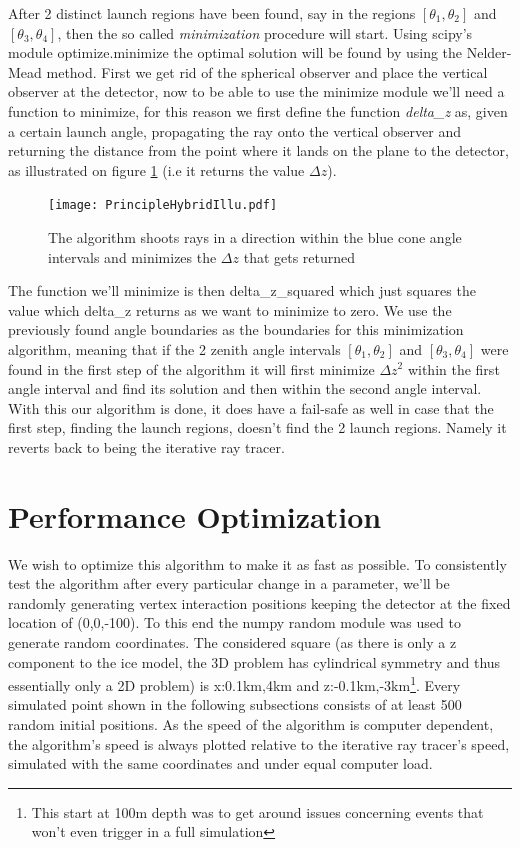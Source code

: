 After 2 distinct launch regions have been found, say in the regions
$[\theta_1,\theta_2]$ and $[\theta_3,\theta_4]$, 
then the so called \textit{minimization} procedure will
start. Using scipy's module optimize.minimize the optimal solution will be
found by using the Nelder-Mead method\cite{10.1093/comjnl/7.4.308}. First we
get rid of the spherical observer and place the vertical observer at the
detector, now to be able to use the minimize module we'll need a function to
minimize, for this reason we first define the function \textit{delta\_z} as,
given a certain launch angle, propagating the ray onto the vertical observer
and returning the distance from the point where it lands on the plane to the
detector, as illustrated on figure \ref{fig:PrincipleHybridIllu} (i.e it
returns the value $\Delta z$).
\begin{figure}
  \centering
  \texttt{[image: PrincipleHybridIllu.pdf]}
  \caption{The algorithm shoots rays in a direction within the blue cone angle intervals and minimizes the $\Delta z$ that gets returned}
  \label{fig:PrincipleHybridIllu}
\end{figure}
The function we'll minimize is then delta\_z\_squared which just squares the
value which delta\_z returns as we want to minimize to zero. 
We use the previously found angle boundaries as
the boundaries for this minimization algorithm, meaning that if the 2 zenith
angle intervals $[\theta_1,\theta_2]$ and $[\theta_3,\theta_4]$ were found in
the first step of the algorithm it will first minimize $\Delta z^2$ within the
first angle interval and find its solution and then within the second angle
interval. With this our algorithm is done, it does have a fail-safe as well in case
that the first step, finding the launch regions, doesn't find the 2 launch
regions.  Namely it reverts back to being the iterative ray tracer.

\section{Performance Optimization} 
We wish to optimize this algorithm to make
it as fast as possible.  To consistently test the algorithm after every
particular change in a parameter, we'll be randomly generating vertex
interaction positions keeping the detector at the fixed location of (0,0,-100).  To
this end the numpy random module was used to generate random coordinates. The
considered square (as there is only a z component to the ice model, the 3D
problem has cylindrical symmetry and thus essentially only a 2D problem) is
x:0.1km,4km and z:-0.1km,-3km\footnote{This start at 100m depth was to get
around issues concerning events that won't even trigger in a full simulation}.
Every simulated point shown in the following subsections consists of at least
500 random initial positions.  As the speed of the algorithm is computer
dependent, the algorithm's speed is always plotted relative to the iterative ray
tracer's speed, simulated with the same coordinates and under equal computer load.

